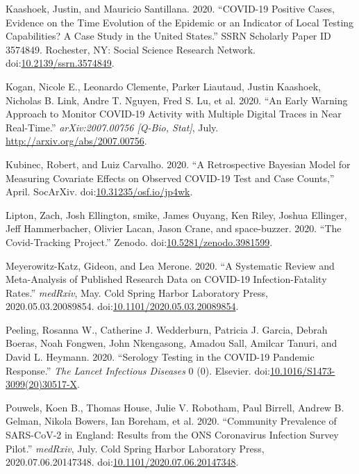 \documentclass[10pt,letterpaper]{article}
\begin{document}
\hypertarget{ref-kaashoekCOVID19PositiveCases2020a}{}
Kaashoek, Justin, and Mauricio Santillana. 2020. ``COVID-19 Positive
Cases, Evidence on the Time Evolution of the Epidemic or an Indicator of
Local Testing Capabilities? A Case Study in the United States.'' SSRN
Scholarly Paper ID 3574849. Rochester, NY: Social Science Research
Network.
doi:\href{https://doi.org/10.2139/ssrn.3574849}{10.2139/ssrn.3574849}.

\hypertarget{ref-koganEarlyWarningApproach2020}{}
Kogan, Nicole E., Leonardo Clemente, Parker Liautaud, Justin Kaashoek,
Nicholas B. Link, Andre T. Nguyen, Fred S. Lu, et al. 2020. ``An Early
Warning Approach to Monitor COVID-19 Activity with Multiple Digital
Traces in Near Real-Time.'' \emph{arXiv:2007.00756 {[}Q-Bio, Stat{]}},
July. \url{http://arxiv.org/abs/2007.00756}.

\hypertarget{ref-kubinecRetrospectiveBayesianModel2020}{}
Kubinec, Robert, and Luiz Carvalho. 2020. ``A Retrospective Bayesian
Model for Measuring Covariate Effects on Observed COVID-19 Test and Case
Counts,'' April. SocArXiv.
doi:\href{https://doi.org/10.31235/osf.io/jp4wk}{10.31235/osf.io/jp4wk}.

\hypertarget{ref-zachliptonCovidTrackingProject2020}{}
Lipton, Zach, Josh Ellington, smike, James Ouyang, Ken Riley, Joshua
Ellinger, Jeff Hammerbacher, Olivier Lacan, Jason Crane, and
space-buzzer. 2020. ``The Covid-Tracking Project.'' Zenodo.
doi:\href{https://doi.org/10.5281/zenodo.3981599}{10.5281/zenodo.3981599}.

\hypertarget{ref-meyerowitz-katzSystematicReviewMetaanalysis2020}{}
Meyerowitz-Katz, Gideon, and Lea Merone. 2020. ``A Systematic Review and
Meta-Analysis of Published Research Data on COVID-19 Infection-Fatality
Rates.'' \emph{medRxiv}, May. Cold Spring Harbor Laboratory Press,
2020.05.03.20089854.
doi:\href{https://doi.org/10.1101/2020.05.03.20089854}{10.1101/2020.05.03.20089854}.

\hypertarget{ref-peelingSerologyTestingCOVID192020}{}
Peeling, Rosanna W., Catherine J. Wedderburn, Patricia J. Garcia, Debrah
Boeras, Noah Fongwen, John Nkengasong, Amadou Sall, Amilcar Tanuri, and
David L. Heymann. 2020. ``Serology Testing in the COVID-19 Pandemic
Response.'' \emph{The Lancet Infectious Diseases} 0 (0). Elsevier.
doi:\href{https://doi.org/10.1016/S1473-3099(20)30517-X}{10.1016/S1473-3099(20)30517-X}.

\hypertarget{ref-pouwelsCommunityPrevalenceSARSCoV22020}{}
Pouwels, Koen B., Thomas House, Julie V. Robotham, Paul Birrell, Andrew
B. Gelman, Nikola Bowers, Ian Boreham, et al. 2020. ``Community
Prevalence of SARS-CoV-2 in England: Results from the ONS Coronavirus
Infection Survey Pilot.'' \emph{medRxiv}, July. Cold Spring Harbor
Laboratory Press, 2020.07.06.20147348.
doi:\href{https://doi.org/10.1101/2020.07.06.20147348}{10.1101/2020.07.06.20147348}.
\end{document}
